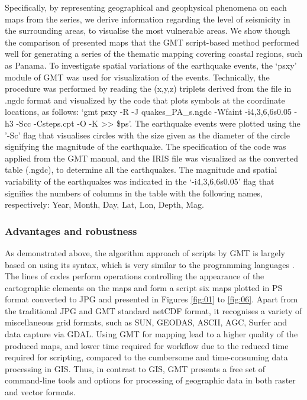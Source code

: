 \documentclass[USenglish,twocolumn]{article}
\begin{document}
Specifically, by representing geographical and geophysical  phenomena on each maps from the series, we derive information regarding the level of seismicity in the surrounding areas, to visualise the most vulnerable areas. We show though the comparison of presented maps that the GMT script-based method performed well for generating a series of the thematic mapping covering coastal regions, such as Panama.
To investigate spatial variations of the earthquake events, the ‘psxy’ module of GMT was used for visualization of the events. Technically, the procedure was performed by reading the (x,y,z) triplets derived from the file in .ngdc format and visualized by the code that plots symbols at the coordinate locations, as follows: ‘gmt psxy -R -J quakes\_PA\_s.ngdc -Wfaint -i4,3,6,6s0.05 -h3 -Scc -Csteps.cpt -O -K >> \$ps’. The earthquake events were plotted using the '-Sc' flag that visualises circles with the size given as the diameter of the circle signifying the magnitude of the earthquake. The specification of the code was applied from the GMT manual, and the IRIS file was visualized as the converted table (.ngdc), to determine all the earthquakes. The magnitude and spatial variability of the earthquakes was indicated in the ‘-i4,3,6,6s0.05’ flag that signifies the numbers of columns in the table with the following names, respectively: Year, Month, Day, Lat, Lon, Depth, Mag. 

\subsubsection{Advantages and robustness}
As demonstrated above, the algorithm approach of scripts by GMT is largely based on using its syntax, which is very similar to the programming languages \cite{Lemenkov202103,Lemenkov202107}. The lines of codes perform operations controlling the appearance of the cartographic elements on the maps and form a script  six maps plotted in PS format converted to JPG and presented in Figures \ref{fig:01} to \ref{fig:06}. Apart from the traditional JPG and GMT standard netCDF format, it recognises a variety of miscellaneous grid formats, such as SUN, GEODAS, ASCII, AGC, Surfer and data capture via GDAL. Using GMT for mapping lead to a higher quality of the produced maps, and lower time required for workflow due to the reduced time required for scripting, compared to the cumbersome and time-consuming data processing in GIS. Thus, in contrast to GIS, GMT presents a free set of command-line tools and options for processing of geographic data in both raster and vector formats.
\end{document}
